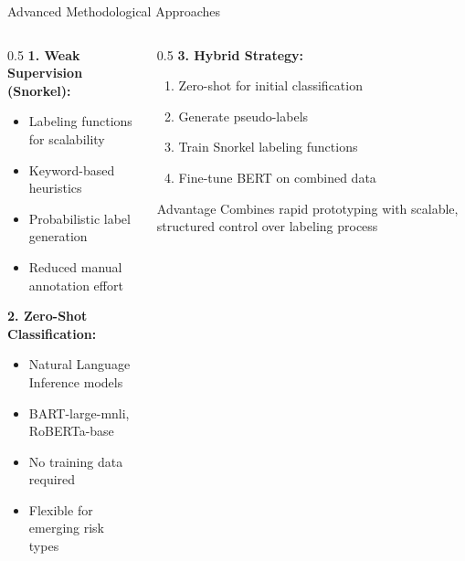 \documentclass[aspectratio=169]{beamer}
\begin{document}
\begin{frame}{Advanced Methodological Approaches}
\begin{columns}
\begin{column}{0.5\textwidth}
\textbf{1. Weak Supervision (Snorkel):}
\begin{itemize}
    \item Labeling functions for scalability
    \item Keyword-based heuristics
    \item Probabilistic label generation
    \item Reduced manual annotation effort
\end{itemize}

\textbf{2. Zero-Shot Classification:}
\begin{itemize}
    \item Natural Language Inference models
    \item BART-large-mnli, RoBERTa-base
    \item No training data required
    \item Flexible for emerging risk types
\end{itemize}
\end{column}
\begin{column}{0.5\textwidth}
\textbf{3. Hybrid Strategy:}
\begin{enumerate}
    \item Zero-shot for initial classification
    \item Generate pseudo-labels
    \item Train Snorkel labeling functions
    \item Fine-tune BERT on combined data
\end{enumerate}

\begin{block}{Advantage}
Combines rapid prototyping with scalable, structured control over labeling process
\end{block}
\end{column}
\end{columns}
\end{frame}
%
%
\end{document}
